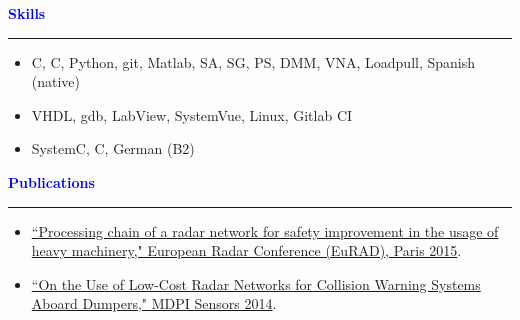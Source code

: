 \documentclass[10pt, letterpaper]{letter}
\def\myplus{\hspace{-.3em}\raisebox{.4ex}{ \tiny +}}
\def\cpp{C\myplus\myplus}
\def\csharp{C\nolinebreak[4]\hspace{-.3em}\raisebox{.25ex}{ \small \#}}
\def\sa{\raisebox{-.4ex}{\FilledSmallCircle\FilledSmallCircle\FilledSmallCircle\FilledSmallCircle\FilledSmallCircle}}
\def\sb{\raisebox{-.4ex}{\FilledSmallCircle\FilledSmallCircle\FilledSmallCircle\FilledSmallCircle\SmallCircle}}
\def\sc{\raisebox{-.4ex}{\FilledSmallCircle\FilledSmallCircle\FilledSmallCircle\SmallCircle\SmallCircle}}
\begin{document}
\begin{minipage}[t]{.47\linewidth}
    \textcolor{Blue}{
        \large\textbf{Skills}
        \vspace{3pt}
        \hrule height 1.5pt
	\vspace{6pt}
    }
    \begin{itemize}[leftmargin=5.3em]
        \item[\sa] C, \cpp, Python, git, Matlab, SA, SG, PS, DMM, VNA, Loadpull, Spanish (native)
        \item[\sb] VHDL, gdb, LabView, SystemVue, Linux, Gitlab CI
        \item[\sc] SystemC, \csharp, German (B2)
    \end{itemize}
\end{minipage}
\hfill
\begin{minipage}[t]{.51\linewidth}
    \textcolor{Blue}{
        \large\textbf{Publications}
        \vspace{3pt}
        \hrule height 1.5pt
	\vspace{6pt}
    }
    \begin{itemize}[label=$\bullet$, leftmargin=1em]
	\item \href{http://ieeexplore.ieee.org/xpl/login.jsp?tp=&arnumber=7346261&url=http\%3A\%2F\%2Fieeexplore.ieee.org\%2Fxpls\%2Fabs\_all.jsp\%3Farnumber\%3D7346261}{``Processing chain of a radar network for safety improvement in the usage of heavy machinery," European Radar Conference (EuRAD), Paris 2015}.
	\item \href{http://www.mdpi.com/1424-8220/14/3/3921}{``On the Use of Low-Cost Radar Networks for Collision Warning Systems Aboard Dumpers," MDPI Sensors 2014}.
    \end{itemize}
\end{minipage}

\vfill
\end{document}
